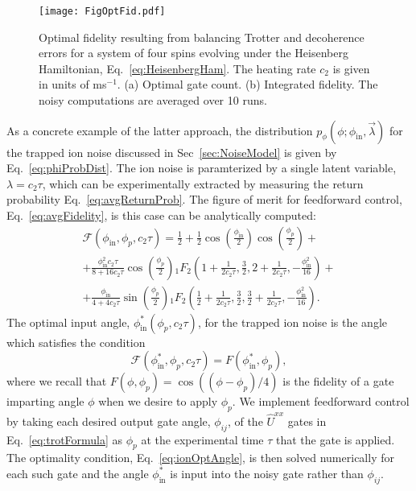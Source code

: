 \documentclass[prx,aps,twocolumn,showpacs,superscriptaddress,10pt]{revtex4-1}
\begin{document}
\begin{figure*}[t!]
	\centering
	\texttt{[image: FigOptFid.pdf]}
	\caption{Optimal fidelity resulting from balancing Trotter and decoherence errors for a system of four spins evolving under the Heisenberg Hamiltonian, Eq.~\eqref{eq:HeisenbergHam}. The heating rate $c_{2}$ is given in units of ms$^{-1}$. (a) Optimal gate count. (b) Integrated fidelity. The noisy computations are averaged over 10 runs.}
	\label{fig:optimalFid}
\end{figure*}

As a concrete example of the latter approach, the distribution $p_{\phi}\left(\phi;\phi_\textrm{in},\vec{\lambda}\right)$  for the trapped ion noise discussed in Sec~\ref{sec:NoiseModel} is given by  Eq.~\eqref{eq:phiProbDist}. The ion noise is paramterized by a single latent variable, $\lambda=c_{2}\tau$, which can be experimentally extracted by measuring the return probability Eq.~\eqref{eq:avgReturnProb}. The figure of merit for feedforward control, Eq.~\eqref{eq:avgFidelity}, is this case can be analytically computed:
\begin{multline}\label{eq:ionAvgFidelity}
	\mathcal{F}\left(\phi_\textrm{in},\phi_{p},c_{2}\tau\right) = \frac{1}{2} + \frac{1}{2}\cos\left(\frac{\phi_\textrm{in}}{2}\right)\cos\left(\frac{\phi_{p}}{2}\right)+\\
	+\frac{\phi_\textrm{in}^{2}c_{2}\tau}{8+16c_{2}\tau}\cos\left(\frac{\phi_{p}}{2}\right) {}_{1}F_{2}\left(1+\frac{1}{2c_{2}\tau}, \frac{3}{2},2+\frac{1}{2c_{2}\tau},-\frac{\phi_\textrm{in}^{2}}{16}\right)+\\
	+\frac{\phi_\textrm{in}}{4+4c_{2}\tau}\sin\left(\frac{\phi_{p}}{2}\right) {}_{1}F_{2}\left(\frac{1}{2}+\frac{1}{2c_{2}\tau}, \frac{3}{2}, \frac{3}{2}+\frac{1}{2c_{2}\tau}, -\frac{\phi_\textrm{in}^{2}}{16}\right).
\end{multline}
The optimal input angle, $\phi_\textrm{in}^{*}\left(\phi_{p},c_{2}\tau\right)$, for the trapped ion noise is the angle which satisfies the condition
\begin{equation}\label{eq:ionOptAngle}
	\mathcal{F}\left(\phi_\textrm{in}^{*},\phi_{p},c_{2}\tau\right)=F\left(\phi_\textrm{in}^{*},\phi_{p}\right),
\end{equation} 
where we recall that $F\left(\phi,\phi_{p}\right)=\cos\left((\phi-\phi_{p})/4\right)$ is the fidelity of a gate imparting angle $\phi$ when we desire to apply $\phi_{p}$. We implement feedforward control by taking each desired output gate angle, $\phi_{ij}$, of the $\hat{U}^{xx}$ gates in Eq.~\eqref{eq:trotFormula} as $\phi_{p}$ at the experimental time $\tau$ that the gate is applied. The optimality condition, Eq.~\eqref{eq:ionOptAngle}, is then solved numerically for each such gate and the angle $\phi_\textrm{in}^{*}$ is input into the noisy gate rather than $\phi_{ij}$. 
\end{document}
